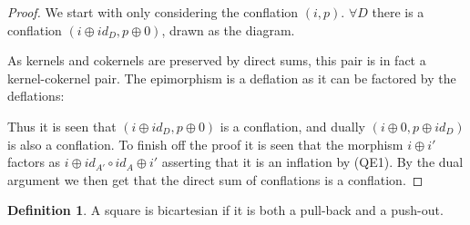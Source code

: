 \documentclass[12pt]{article}
\theoremstyle{definition}
\newtheorem{definition}{Definition}[section]
\theoremstyle{remark}
\begin{document}
            \begin{proof}
                We start with only considering the conflation $(i,p)$. $\forall{D}$ there is a conflation $(i\oplus id_D, p\oplus 0)$, drawn as the diagram.
                \begin{center}
                \end{center}
                As kernels and cokernels are preserved by direct sums, this pair is in fact a kernel-cokernel pair. The epimorphism is a deflation as it can be factored by the deflations:
                \begin{center}
                \end{center}
                Thus it is seen that $(i\oplus id_D, p\oplus 0)$ is a conflation, and dually $(i\oplus 0, p\oplus id_D)$ is also a conflation. To finish off the proof it is seen that the morphism $i\oplus i'$ factors as $i\oplus id_{A'}\circ id_A\oplus i'$ asserting that it is an inflation by (QE1). By the dual argument we then get that the direct sum of conflations is a conflation.
            \end{proof}

            \begin{definition}
                A square is bicartesian if it is both a pull-back and a push-out.
            \end{definition}
\end{document}
